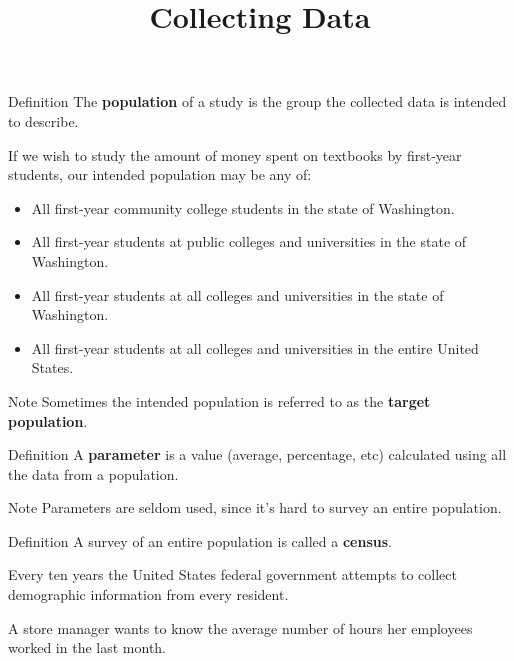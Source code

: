 \documentclass{beamer}
\title[MATH 1030 - Module 7 - Intro to Stats]{Collecting Data}
\begin{document}
\begin{frame}
\titlepage
\end{frame}

\begin{frame}
\onslide<+->
\begin{block}{Definition}
The \textbf{population} of a study is the group the collected data is intended to describe.
\end{block}

\onslide<+->
\begin{example}
If we wish to study the amount of money spent on textbooks by first-year students, our intended population may be any of:
\begin{itemize}[<+- | alert@+>]
\item All first-year community college students in the state of Washington.
\item All first-year students at public colleges and universities in the state of Washington.
\item All first-year students at all colleges and universities in the state of Washington.
\item All first-year students at all colleges and universities in the entire United States.
\end{itemize}
\end{example}

\onslide<+->
\begin{block}{Note}
Sometimes the intended population is referred to as the \textbf{target population}.
\end{block}
\end{frame}

\begin{frame}
\begin{block}{Definition}
A \textbf{parameter} is a value (average, percentage, etc) calculated using all the data from a population.
\end{block}\pause

\begin{block}{Note}
Parameters are seldom used, since it's hard to survey an entire population.
\end{block}\pause

\begin{block}{Definition}
A survey of an entire population is called a \textbf{census}.
\end{block}\pause

\begin{example}
Every ten years the United States federal government attempts to collect demographic information from every resident.
\end{example}\pause

\begin{example}
A store manager wants to know the average number of hours her employees worked in the last month.
\end{example}
\end{frame}
\end{document}
